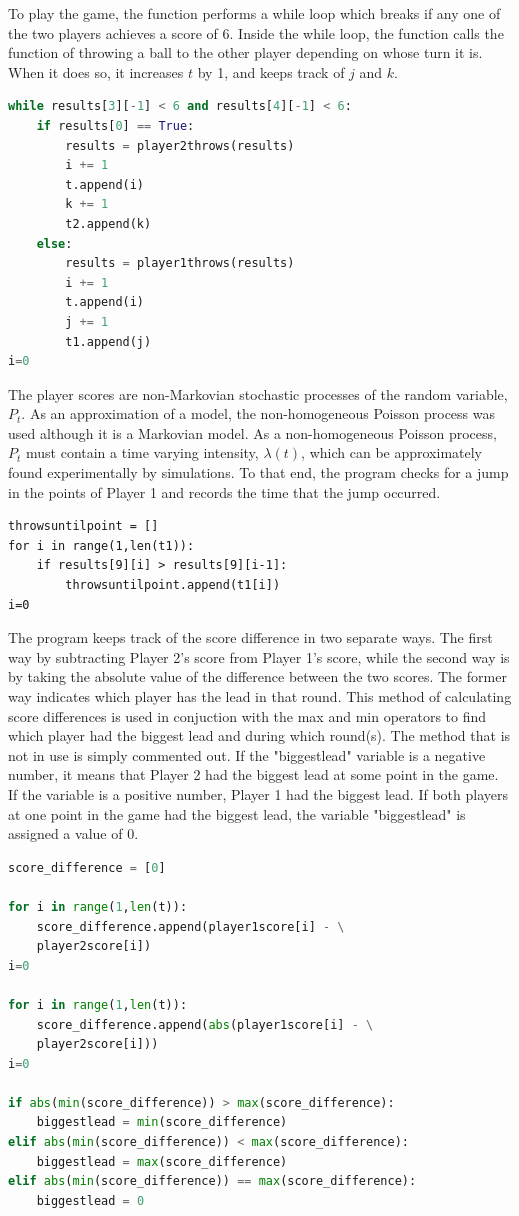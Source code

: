 \documentclass{article}
\begin{document}
To play the game, the function performs a while loop which breaks if any one of the two players achieves a score of 6. Inside the while loop, the function calls the function of throwing a ball to the other player depending on whose turn it is. When it does so, it increases $t$ by 1, and keeps track of $j$ and $k$.
\begin{lstlisting}[language=Python]
while results[3][-1] < 6 and results[4][-1] < 6:
    if results[0] == True:
        results = player2throws(results)
        i += 1
        t.append(i)
		k += 1
		t2.append(k)
    else:
        results = player1throws(results)
	    i += 1
	    t.append(i)
	    j += 1
	    t1.append(j)
i=0
\end{lstlisting}

The player scores are non-Markovian stochastic processes of the random variable, $P_t$. As an approximation of a model, the non-homogeneous Poisson process was used although it is a Markovian model. As a non-homogeneous Poisson process, $P_t$ must contain a time varying intensity, $\lambda(t)$, which can be approximately found experimentally by simulations. To that end, the program checks for a jump in the points of Player 1 and records the time that the jump occurred. 
\begin{lstlisting}
throwsuntilpoint = []
for i in range(1,len(t1)):
    if results[9][i] > results[9][i-1]:
        throwsuntilpoint.append(t1[i])
i=0
\end{lstlisting}

The program keeps track of the score difference in two separate ways. The first way by subtracting Player 2's score from Player 1's score, while the second way is by taking the absolute value of the difference between the two scores. The former way indicates which player has the lead in that round. This method of calculating score differences is used in conjuction with the max and min operators to find which player had the biggest lead and during which round(s). The method that is not in use is simply commented out. If the "biggestlead" variable is a negative number, it means that Player 2 had the biggest lead at some point in the game. If the variable is a positive number, Player 1 had the biggest lead. If both players at one point in the game had the biggest lead, the variable "biggestlead" is assigned a value of 0.
\begin{lstlisting}[language=Python]
score_difference = [0]

for i in range(1,len(t)):
    score_difference.append(player1score[i] - \
    player2score[i])
i=0

for i in range(1,len(t)):
    score_difference.append(abs(player1score[i] - \
    player2score[i]))
i=0

if abs(min(score_difference)) > max(score_difference):
    biggestlead = min(score_difference)
elif abs(min(score_difference)) < max(score_difference):
    biggestlead = max(score_difference)
elif abs(min(score_difference)) == max(score_difference):
    biggestlead = 0
\end{lstlisting}
\end{document}
